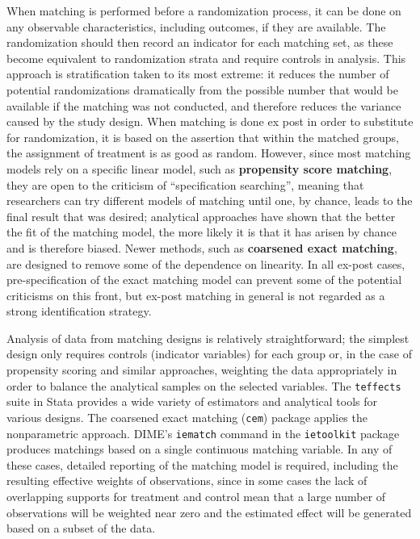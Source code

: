 When matching is performed before a randomization process,
it can be done on any observable characteristics,
including outcomes, if they are available.
The randomization should then record an indicator for each matching set,
as these become equivalent to randomization strata and require controls in analysis.
This approach is stratification taken to its most extreme:
it reduces the number of potential randomizations dramatically
from the possible number that would be available
if the matching was not conducted,
and therefore reduces the variance caused by the study design.
When matching is done ex post in order to substitute for randomization,
it is based on the assertion that within the matched groups,
the assignment of treatment is as good as random.
However, since most matching models rely on a specific linear model,
such as \textbf{propensity score matching},
they are open to the criticism of ``specification searching'',
meaning that researchers can try different models of matching
until one, by chance, leads to the final result that was desired;
analytical approaches have shown that the better the fit of the matching model,
the more likely it is that it has arisen by chance and is therefore biased.\cite{king2019propensity}
Newer methods, such as \textbf{coarsened exact matching},\cite{iacus2012causal}
are designed to remove some of the dependence on linearity.
In all ex-post cases, pre-specification of the exact matching model
can prevent some of the potential criticisms on this front,
but ex-post matching in general is not regarded as a strong identification strategy.

Analysis of data from matching designs is relatively straightforward;
the simplest design only requires controls (indicator variables) for each group
or, in the case of propensity scoring and similar approaches,
weighting the data appropriately in order to balance the analytical samples on the selected variables.
The \texttt{teffects} suite in Stata provides a wide variety
of estimators and analytical tools for various designs.\cite{sscc2015}
The coarsened exact matching (\texttt{cem}) package applies the nonparametric approach.\cite{blackwell2009cem}
DIME's \texttt{iematch} command in the \texttt{ietoolkit} package produces matchings based on a single continuous matching variable.
In any of these cases, detailed reporting of the matching model is required,
including the resulting effective weights of observations,
since in some cases the lack of overlapping supports for treatment and control
mean that a large number of observations will be weighted near zero
and the estimated effect will be generated based on a subset of the data.


